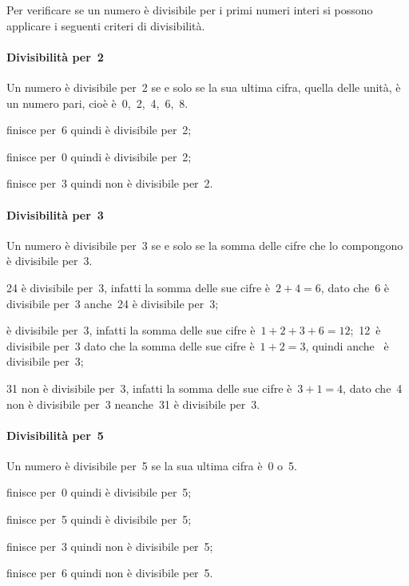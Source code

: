 Per verificare se un numero è divisibile per i primi numeri interi si possono applicare i seguenti criteri di
divisibilità.

\paragraph{Divisibilità per~2} Un numero è divisibile per~2 se e solo se la sua ultima cifra, quella delle unità,
è un numero pari, cioè è~0,~2,~4,~6,~8.

\begin{itemize*}
 \item {} finisce per~6 quindi è divisibile per~2;
 \item {} finisce per~0 quindi è divisibile per~2;
 \item {} finisce per~3 quindi non è divisibile per~2.
\end{itemize*}

\paragraph{Divisibilità per~3} Un numero è divisibile per~3 se e solo se la somma delle cifre che lo
compongono è divisibile per~3.
\begin{itemize*}
 \item 24 è divisibile per~3, infatti la somma delle sue cifre è~$2+4=6$, dato che~6 è divisibile per~3
anche~24 è divisibile per~3;
 \item {} è divisibile per~3, infatti la somma delle sue cifre è~$1+2+3+6=12$;~12~è divisibile per~3
dato che la somma delle sue cifre è~$1+2=3$, quindi anche~ è divisibile per~3;
 \item 31 non è divisibile per~3, infatti la somma delle sue cifre è~$3+1=4$, dato che~4 non è
divisibile per~3 neanche~31 è divisibile per~3.
\end{itemize*}

\paragraph{Divisibilità per~5} Un numero è divisibile per~5 se la sua ultima cifra è~0 o~5.
\begin{itemize*}
 \item {} finisce per~0 quindi è divisibile per~5;
 \item {} finisce per~5 quindi è divisibile per~5;
 \item {} finisce per~3 quindi non è divisibile per~5;
 \item {} finisce per~6 quindi non è divisibile per~5.
\end{itemize*}

